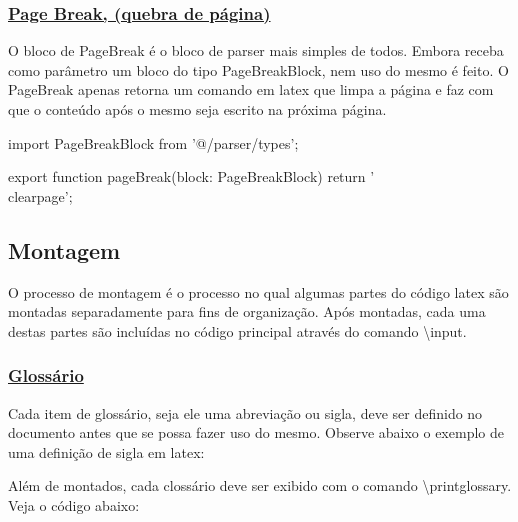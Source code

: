 \subsubsection{\underline{Page Break, (quebra de página)}}

O bloco de PageBreak é o bloco de parser mais simples de todos.
Embora receba como parâmetro um bloco do tipo PageBreakBlock,
nem uso do mesmo é feito.
O PageBreak apenas retorna um comando em
\acrshort{latex}
que limpa a página e faz com que o conteúdo após o mesmo
seja escrito na próxima página.

\begin{getPageBreak1}
import { PageBreakBlock } from '@/parser/types';

export function pageBreak(block: PageBreakBlock){
    return '\\clearpage';
}
\end{getPageBreak1}

\subsection{Montagem}

O processo de montagem é o processo no qual algumas partes do código
\acrshort{latex}
são montadas separadamente para fins de organização.
Após montadas, cada uma destas partes são incluídas no código principal
através do comando \textbackslash input.

\subsubsection{\underline{Glossário}}

Cada item de glossário, seja ele uma abreviação ou sigla,
deve ser definido no documento antes que se possa fazer uso do mesmo.
Observe abaixo o exemplo de uma definição de sigla em
\acrshort{latex}:

\begin{Code9f40c1fe083b42cb80ca5746da70f6f5}
\end{Code9f40c1fe083b42cb80ca5746da70f6f5}

Além de montados, cada clossário deve ser exibido com o comando
\textbackslash printglossary. Veja o código abaixo:

\begin{Codeebf6f157e3c84c18a15b7acece5c7035}
\printglossary[type=sigla,title=LISTA DE SIGLAS]
\clearpage

\printglossary[type=abreviacao,title=LISTA DE ABREVIATURAS]
\clearpage
\end{Codeebf6f157e3c84c18a15b7acece5c7035}

